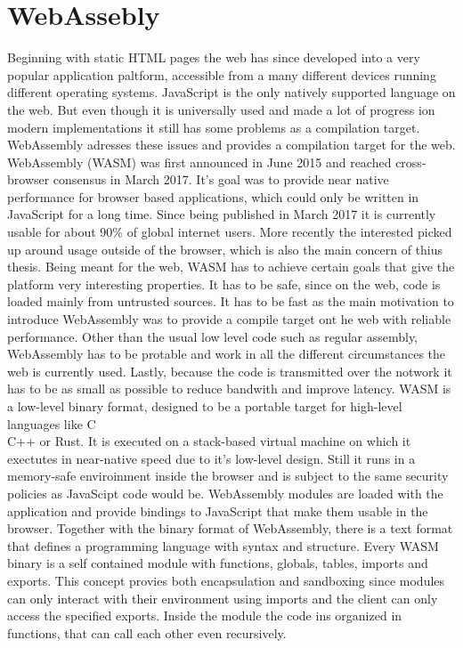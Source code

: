 \section{WebAssebly}
Beginning with static HTML pages the web has since developed into a very popular application paltform, accessible from a many different devices running different operating systems. JavaScript is the only natively supported language on the web. But even though it is universally used and made a lot of progress ion modern implementations it still has some problems as a compilation target. WebAssembly adresses these issues and provides a compilation target for the web.
WebAssembly (WASM) was first announced in June 2015 and reached cross-browser consensus in March 2017. It's goal was to provide near native performance for browser based applications, which could only be written in JavaScript for a long time. Since being published in March 2017 it is currently usable for about 90\% of global internet users. More recently the interested picked up around usage outside of the browser, which is also the main concern of thius thesis.
Being meant for the web, WASM has to achieve certain goals that give the platform very interesting properties. It has to be safe, since on the web, code is loaded mainly from untrusted sources. It has to be fast as the main motivation to introduce WebAssembly was to provide a compile target ont he web with reliable performance. Other than the usual low level code such as regular assembly, WebAssembly has to be protable and work in all the different circumstances the web is currently used. Lastly, because the code is transmitted over the notwork it has to be as small as possible to reduce bandwith and improve latency.
WASM is a low-level binary format, designed to be a portable target for high-level languages like C\\C++ or Rust. It is executed on a stack-based virtual machine on which it exectutes in near-native speed due to it's low-level design. Still it runs in a memory-safe enviroinment inside the browser and is subject to the same security policies as JavaScipt code would be. WebAssembly modules are loaded with the application and provide bindings to JavaScript that make them usable in the browser.
Together with the binary format of WebAssembly, there is a text format that defines a programming language with syntax and structure. Every WASM binary is a self contained module with functions, globals, tables, imports and exports. This concept provies both encapsulation and sandboxing since modules can only interact with their environment using imports and the client can only access the specified exports. Inside the module the code ins organized in functions, that can call each other even recursively.
